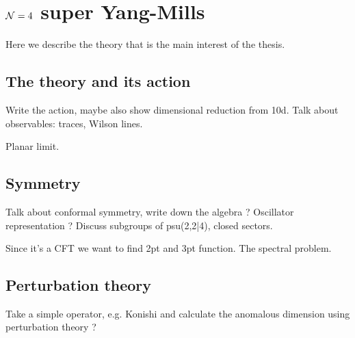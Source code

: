 
\section{$\mathcal{N}=4$ super Yang-Mills}

Here we describe the theory that is the main interest of the thesis.

\subsection{The theory and its action}

Write the action, maybe also show dimensional reduction from 10d. Talk about observables: traces, Wilson lines. 

Planar limit.

\subsection{Symmetry}

Talk about conformal symmetry, write down the algebra ? Oscillator representation ? Discuss subgroups of psu(2,2|4), closed sectors. 

Since it's a CFT we want to find 2pt and 3pt function. The spectral problem.

\subsection{Perturbation theory}

Take a simple operator, e.g. Konishi and calculate the anomalous dimension using perturbation theory ?
